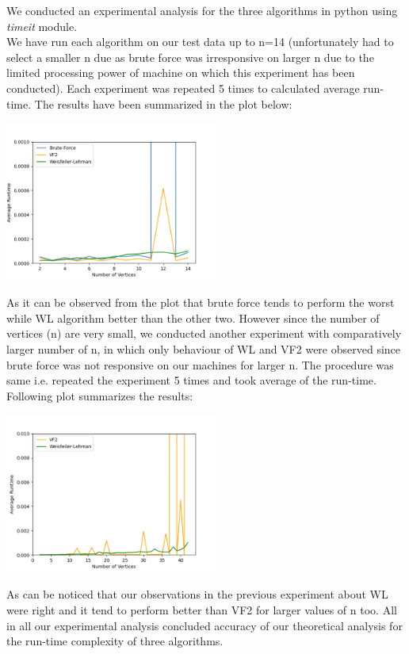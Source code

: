 \documentclass[11pt]{article}
\begin{document}
We conducted an experimental analysis for the three algorithms in python using \textit{timeit} module. \\
We have run each algorithm on our test data up to n=14 (unfortunately had to select a smaller n due as brute force was irresponsive on larger n due to the limited processing power of machine on which this experiment has been conducted). Each experiment was repeated 5 times to calculated average run-time. The results have been summarized in the plot below:\\
\begin{center}
\includegraphics[width=7cm]{experimental.png}
\end{center}
As it can be observed from the plot that brute force tends to perform the worst while WL algorithm better than the other two. However since the number of vertices (n) are very small, we conducted another experiment with comparatively larger number of n, in which only behaviour of WL and VF2 were observed since brute force was not responsive on our machines for larger n. The procedure was same i.e. repeated the experiment 5 times and took average of the run-time.  Following plot summarizes the results:
\begin{center}
\includegraphics[width=7cm]{exp2.png}
\end{center}
As can be noticed that our observations in the previous experiment about WL were right and it tend to perform better than VF2 for larger values of n too.  All in all our experimental analysis concluded accuracy of our theoretical analysis for the run-time complexity of three algorithms. \\
\end{document}
